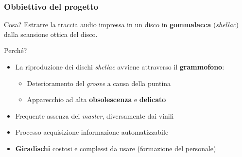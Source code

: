 \begin{frame}

\frametitle{Obbiettivo del progetto}

\begin{block}{Cosa?}
Estrarre la traccia audio impressa in un disco in \textbf{gommalacca}
(\emph{shellac}) dalla scansione ottica del disco.
\end{block}

\begin{block}{Perché?}
\begin{itemize}
\item La riproduzione dei dischi \emph{shellac} avviene attraverso il \textbf{grammofono}:
\vspace{-0.4cm}
\begin{itemize}
\item Deterioramento del \emph{groove} a causa della puntina
\item Apparecchio ad alta \textbf{obsolescenza} e \textbf{delicato}
\end{itemize}
\item Frequente assenza dei \emph{master}, diversamente dai vinili
\item Processo acquisizione informazione automatizzabile
\item \textbf{Giradischi} costosi e complessi da usare (formazione del personale)
\end{itemize}
\end{block}

\end{frame}
